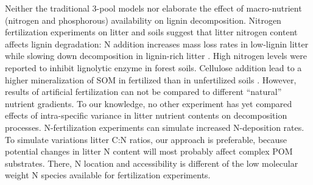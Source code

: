 Neither the traditional 3-pool models nor \cite{Klotzbucher2011} elaborate the effect of macro-nutrient (nitrogen and phosphorous) availability on lignin decomposition. Nitrogen fertilization experiments on litter and soils suggest that litter nitrogen content affects lignin degradation: N addition increases mass loss rates in low-lignin litter while slowing down decomposition in lignin-rich litter \citep{Knorr2005}. High nitrogen levels were reported to inhibit lignolytic enzyme in forest soils\citep{Sinsabaugh2010}. Cellulose addition lead to a higher mineralization of SOM in fertilized than in unfertilized soils \citep{Fontaine2011}. However, results of artificial fertilization can not be compared to different ``natural'' nutrient gradients. To our knowledge, no other experiment has yet compared effects of intra-specific variance in litter nutrient contents on decomposition processes. N-fertilization experiments can simulate increased N-deposition rates. To simulate variations litter C:N ratios, our approach is preferable, because potential changes in litter N content will most probably affect complex POM substrates. There, N location and accessibility is different of the low molecular weight N species available for fertilization experiments. 




